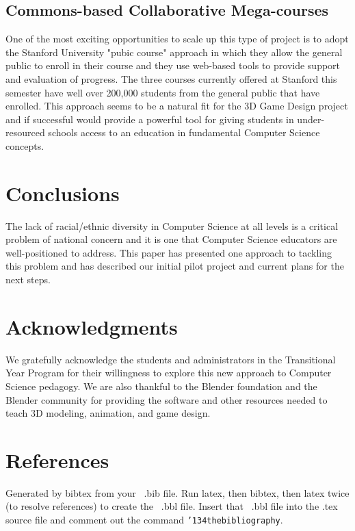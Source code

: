 \documentclass{sig-alternate}
\begin{document}
\subsection{Commons-based Collaborative Mega-courses}
One of the most exciting opportunities to scale up this type of project is to adopt the
Stanford University  "pubic course" approach in which they allow the general public to
enroll in their course and they use web-based tools to provide support and evaluation
of progress. The three courses currently offered at Stanford this semester have well over
200,000 students from the general public that have enrolled.  This approach seems to be
a natural fit for the 3D Game Design project and if successful would provide a powerful
tool for giving students in under-resourced schools access to an education in fundamental
Computer Science concepts.


\section{Conclusions}
The lack of racial/ethnic diversity in Computer Science at all levels is a critical problem of national
concern and it is one that Computer Science educators are well-positioned to address. This paper
has presented one approach to tackling this problem and has described our initial pilot project and
current plans for the next steps.

\section*{Acknowledgments}
We gratefully acknowledge the students and administrators in the Transitional Year Program
for their willingness to explore this new approach to Computer Science pedagogy. We are also
thankful to the Blender foundation and the Blender community for providing the software and
other resources needed to teach 3D modeling, animation, and game design.

%

%
%

\section*{References}
Generated by bibtex from your ~.bib file.  Run latex,
then bibtex, then latex twice (to resolve references)
to create the ~.bbl file.  Insert that ~.bbl file into
the .tex source file and comment out
the command \texttt{{\char'134}thebibliography}.

\end{document}
